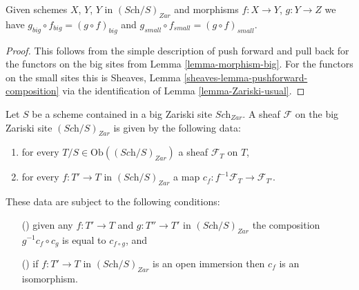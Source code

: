 \begin{lemma}
\label{lemma-composition}
Given schemes $X$, $Y$, $Y$ in $(\textit{Sch}/S)_{Zar}$
and morphisms $f : X \to Y$, $g : Y \to Z$ we have
$g_{big} \circ f_{big} = (g \circ f)_{big}$ and
$g_{small} \circ f_{small} = (g \circ f)_{small}$.
\end{lemma}

\begin{proof}
This follows from the simple description of push forward
and pull back for the functors on the big sites from
Lemma \ref{lemma-morphism-big}. For the functors
on the small sites this is
Sheaves, Lemma \ref{sheaves-lemma-pushforward-composition}
via the identification of Lemma \ref{lemma-Zariski-usual}.
\end{proof}

\begin{lemma}
\label{lemma-characterize-sheaf-big}
Let $S$ be a scheme contained in a big Zariski site $\textit{Sch}_{Zar}$.
A sheaf $\mathcal{F}$ on the big Zariski site $(\textit{Sch}/S)_{Zar}$
is given by the following data:
\begin{enumerate}
\item for every $T/S \in \text{Ob}((\textit{Sch}/S)_{Zar})$ a sheaf
$\mathcal{F}_T$ on $T$,
\item for every $f : T' \to T$ in
$(\textit{Sch}/S)_{Zar}$ a map
$c_f : f^{-1}\mathcal{F}_{T} \to \mathcal{F}_{T'}$.
\end{enumerate}
These data are subject to the following conditions:
\begin{enumerate}
\item[(\romannumeral1)] given any $f : T' \to T$ and $g : T'' \to T'$ in
$(\textit{Sch}/S)_{Zar}$ the composition $g^{-1}c_f \circ c_g$
is equal to $c_{f \circ g}$, and
\item[(\romannumeral2)] if $f : T' \to T$ in $(\textit{Sch}/S)_{Zar}$ is an
open immersion then $c_f$ is an isomorphism.
\end{enumerate}
\end{lemma}

